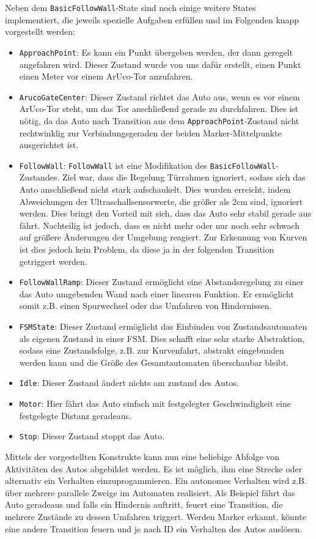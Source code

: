 Neben dem \texttt{BasicFollowWall}-State sind noch einige weitere States implementiert, die jeweils spezielle Aufgaben erfüllen und im Folgenden knapp vorgestellt werden:
\begin{itemize}
	\item \texttt{ApproachPoint}: Es kann ein Punkt übergeben werden, der dann geregelt angefahren wird. Dieser Zustand wurde von uns dafür erstellt, einen Punkt einen Meter vor einem ArUco-Tor anzufahren.
	\item \texttt{ArucoGateCenter}: Dieser Zustand richtet das Auto aus, wenn es vor einem ArUco-Tor steht, um das Tor anschließend gerade zu durchfahren. Dies ist nötig, da das Auto nach Transition aus dem \texttt{ApproachPoint}-Zustand nicht rechtwinklig zur Verbindungsgeraden der beiden Marker-Mittelpunkte ausgerichtet ist.
	\item \texttt{FollowWall}: \texttt{FollowWall} ist eine Modifikation des \texttt{BasicFollowWall}-Zustandes. Ziel war, dass die Regelung Türrahmen ignoriert, sodass sich das Auto anschließend nicht stark aufschaukelt. Dies wurden erreicht, indem Abweichungen der Ultraschallsensorwerte, die größer als 2cm sind, ignoriert werden. Dies bringt den Vorteil mit sich, dass das Auto sehr stabil gerade aus fährt. Nachteilig ist jedoch, dass es nicht mehr oder nur noch sehr schwach auf größere Änderungen der Umgebung reagiert. Zur Erkennung von Kurven ist dies jedoch kein Problem, da diese ja in der folgenden Transition getriggert werden.
	\item \texttt{FollowWallRamp}: Dieser Zustand ermöglicht eine Abstandsregelung zu einer das Auto umgebenden Wand nach einer linearen Funktion. Er ermöglicht somit z.B. einen Spurwechsel oder das Umfahren von Hindernissen.
	\item \texttt{FSMState}: Dieser Zustand ermöglicht das Einbinden von Zustandsautomaten als eigenen Zustand in einer FSM. Dies schafft eine sehr starke Abstraktion, sodass eine Zustandsfolge, z.B. zur Kurvenfahrt, abstrakt eingebunden werden kann und die Größe des Gesamtautomaten überschaubar bleibt.
	\item \texttt{Idle}: Dieser Zustand ändert nichts am zustand des Autos. 
	\item \texttt{Motor}: Hier fährt das Auto einfach mit festgelegter Geschwindigkeit eine festgelegte Distanz geradeaus.
	\item \texttt{Stop}: Dieser Zustand stoppt das Auto.
\end{itemize}
Mittels der vorgestellten Konstrukte kann nun eine beliebige Abfolge von Aktivitäten des Autos abgebildet werden. Es ist möglich, ihm eine Strecke oder alternativ ein Verhalten einzuprogammieren. Ein autonomes Verhalten wird z.B. über mehrere parallele Zweige im Automaten realisiert. Als Beispiel fährt das Auto geradeaus und falls ein Hindernis auftritt, feuert eine Transition, die mehrere Zustände zu dessen Umfahren triggert. Werden Marker erkannt, könnte eine andere Transition feuern und je nach ID ein Verhalten des Autos auslösen.

